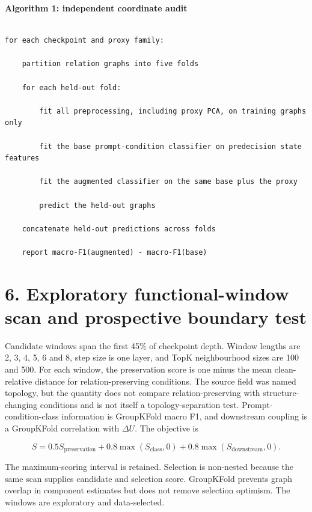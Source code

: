 \documentclass[10pt]{article}
\begin{document}
\textbf{Algorithm 1: independent coordinate audit}

\begin{Verbatim}[fontsize=\small,breaklines=true,breakanywhere=true]

for each checkpoint and proxy family:

    partition relation graphs into five folds

    for each held-out fold:

        fit all preprocessing, including proxy PCA, on training graphs only

        fit the base prompt-condition classifier on predecision state features

        fit the augmented classifier on the same base plus the proxy

        predict the held-out graphs

    concatenate held-out predictions across folds

    report macro-F1(augmented) - macro-F1(base)

\end{Verbatim}

\section*{6. Exploratory functional-window scan and prospective boundary test}

Candidate windows span the first 45\% of checkpoint depth. Window lengths are 2, 3, 4, 5, 6 and 8, step size is one layer, and TopK neighbourhood sizes are 100 and 500. For each window, the preservation score is one minus the mean clean-relative distance for relation-preserving conditions. The source field was named topology, but the quantity does not compare relation-preserving with structure-changing conditions and is not itself a topology-separation test. Prompt-condition-class information is GroupKFold macro F1, and downstream coupling is a GroupKFold correlation with \(\Delta U\). The objective is

\begin{equation*}
S=0.5S_{\mathrm{preservation}}+0.8\max(S_{\mathrm{class}},0)+0.8\max(S_{\mathrm{downstream}},0).
\end{equation*}

The maximum-scoring interval is retained. Selection is non-nested because the same scan supplies candidate and selection score. GroupKFold prevents graph overlap in component estimates but does not remove selection optimism. The windows are exploratory and data-selected.
\end{document}

